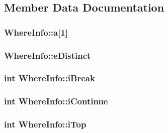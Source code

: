 \subsection{Member Data Documentation}
\hypertarget{struct_where_info_a427337160cbeaf64b23a8241fb10dbf9}{
\subsubsection[{a}]{ Where\-Info\-::a\mbox{[}1\mbox{]}}}\label{struct_where_info_a427337160cbeaf64b23a8241fb10dbf9}
\hypertarget{struct_where_info_a3dd0b1738e0e2fbf5ab61c00939ab532}{
\subsubsection[{e\-Distinct}]{ Where\-Info\-::e\-Distinct}}\label{struct_where_info_a3dd0b1738e0e2fbf5ab61c00939ab532}
\hypertarget{struct_where_info_a338ac73b84c81db455ad7db56b5e4a06}{
\subsubsection[{i\-Break}]{\setlength{\rightskip}{0pt plus 5cm}int Where\-Info\-::i\-Break}}\label{struct_where_info_a338ac73b84c81db455ad7db56b5e4a06}
\hypertarget{struct_where_info_a5b8eb73a6a5bba7ef126b9de13ee8537}{
\subsubsection[{i\-Continue}]{\setlength{\rightskip}{0pt plus 5cm}int Where\-Info\-::i\-Continue}}\label{struct_where_info_a5b8eb73a6a5bba7ef126b9de13ee8537}
\hypertarget{struct_where_info_a4edc0a92a162cbe63ac8f52e923fb038}{
\subsubsection[{i\-Top}]{\setlength{\rightskip}{0pt plus 5cm}int Where\-Info\-::i\-Top}}\label{struct_where_info_a4edc0a92a162cbe63ac8f52e923fb038}
